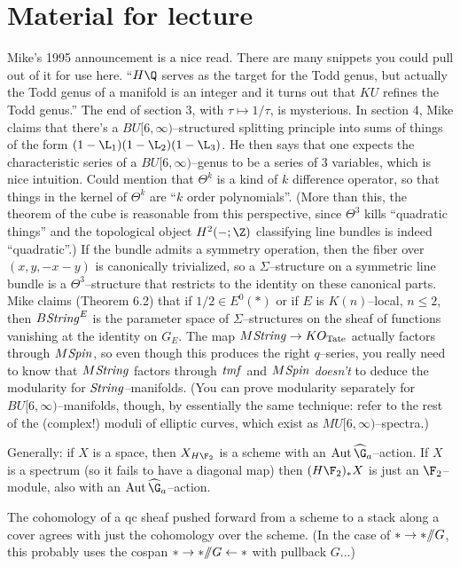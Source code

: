\documentclass[12pt]{book}
\begin{document}
\chapter*{Material for lecture}






Mike's 1995 announcement is a nice read. There are many snippets you could pull out of it for use here. ``$H\Q$ serves as the target for the Todd genus, but actually the Todd genus of a manifold is an integer and it turns out that $KU$ refines the Todd genus.''  The end of section 3, with $\tau \mapsto 1/\tau$, is mysterious.  In section 4, Mike claims that there's a $BU[6, \infty)$--structured splitting principle into sums of things of the form $(1 - \L_1)(1 - \L_2)(1 - \L_3)$.  He then says that one expects the characteristic series of a $BU[6, \infty)$--genus to be a series of $3$ variables, which is nice intuition.  Could mention that $\Theta^k$ is a kind of $k${\th} difference operator, so that things in the kernel of $\Theta^k$ are ``$k${\th} order polynomials''.  (More than this, the theorem of the cube is reasonable from this perspective, since $\Theta^3$ kills ``quadratic things'' and the topological object $H^2(-; \Z)$ classifying line bundles is indeed ``quadratic''.)  If the bundle admits a symmetry operation, then the fiber over $(x, y, -x-y)$ is canonically trivialized, so a $\Sigma$--structure on a symmetric line bundle is a $\Theta^3$--structure that restricts to the identity on these canonical parts.  Mike claims (Theorem 6.2) that if $1/2 \in E^0(*)$ or if $E$ is $K(n)$--local, $n \le 2$, then $B\mathit{String}^E$ is the parameter space of $\Sigma$--structures on the sheaf of functions vanishing at the identity on $G_E$.  The map $M\mathit{String} \to KO_{\mathrm{Tate}}$ actually factors through $M\mathit{Spin}$, so even though this produces the right $q$--series, you really need to know that $M\mathit{String}$ factors through $\mathit{tmf}$ and $M\mathit{Spin}$ \emph{doesn't} to deduce the modularity for $\mathit{String}$--manifolds.  (You can prove modularity separately for $BU[6, \infty)$--manifolds, though, by essentially the same technique: refer to the rest of the (complex!) moduli of elliptic curves, which exist as $MU[6, \infty)$--spectra.)

Generally: if $X$ is a space, then $X_{H\F_2}$ is a scheme with an $\Aut \widehat \G_a$--action. If $X$ is a spectrum (so it fails to have a diagonal map) then $(H\F_2)_* X$ is just an $\F_2$--module, also with an $\Aut \widehat \G_a$--action.

The cohomology of a qc sheaf pushed forward from a scheme to a stack along a cover agrees with just the cohomology over the scheme. (In the case of $* \to * /\!\!/ G$, this probably uses the cospan $* \to * /\!\!/ G \leftarrow *$ with pullback $G$...)
\end{document}
